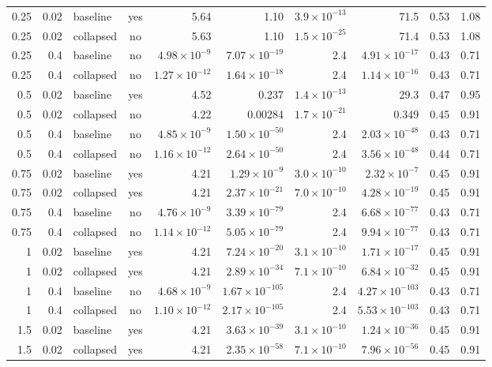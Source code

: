 \documentclass[11pt,letterpaper,fleqn]{article}
\begin{document}
\begin{table}[p]
\begin{adjustbox}{max width=\textwidth}
\begin{tabular}{@{}rrlcrrrrrr@{}}
0.25 & 0.02 & baseline & yes & 5.64 & 1.10 & $3.9\times10^{-13}$ & 71.5 & 0.53 & 1.08\\
0.25 & 0.02 & collapsed & no & 5.63 & 1.10 & $1.5\times10^{-25}$ & 71.4 & 0.53 & 1.08\\
0.25 & 0.4 & baseline & no & $4.98\times10^{-9}$ & $7.07\times10^{-19}$ & 2.4 & $4.91\times10^{-17}$ & 0.43 & 0.71\\
0.25 & 0.4 & collapsed & no & $1.27\times10^{-12}$ & $1.64\times10^{-18}$ & 2.4 & $1.14\times10^{-16}$ & 0.43 & 0.71\\
0.5 & 0.02 & baseline & yes & 4.52 & 0.237 & $1.4\times10^{-13}$ & 29.3 & 0.47 & 0.95\\
0.5 & 0.02 & collapsed & no & 4.22 & 0.00284 & $1.7\times10^{-21}$ & 0.349 & 0.45 & 0.91\\
0.5 & 0.4 & baseline & no & $4.85\times10^{-9}$ & $1.50\times10^{-50}$ & 2.4 & $2.03\times10^{-48}$ & 0.43 & 0.71\\
0.5 & 0.4 & collapsed & no & $1.16\times10^{-12}$ & $2.64\times10^{-50}$ & 2.4 & $3.56\times10^{-48}$ & 0.44 & 0.71\\
0.75 & 0.02 & baseline & yes & 4.21 & $1.29\times10^{-9}$ & $3.0\times10^{-10}$ & $2.32\times10^{-7}$ & 0.45 & 0.91\\
0.75 & 0.02 & collapsed & yes & 4.21 & $2.37\times10^{-21}$ & $7.0\times10^{-10}$ & $4.28\times10^{-19}$ & 0.45 & 0.91\\
0.75 & 0.4 & baseline & no & $4.76\times10^{-9}$ & $3.39\times10^{-79}$ & 2.4 & $6.68\times10^{-77}$ & 0.43 & 0.71\\
0.75 & 0.4 & collapsed & no & $1.14\times10^{-12}$ & $5.05\times10^{-79}$ & 2.4 & $9.94\times10^{-77}$ & 0.43 & 0.71\\
1 & 0.02 & baseline & yes & 4.21 & $7.24\times10^{-20}$ & $3.1\times10^{-10}$ & $1.71\times10^{-17}$ & 0.45 & 0.91\\
1 & 0.02 & collapsed & yes & 4.21 & $2.89\times10^{-34}$ & $7.1\times10^{-10}$ & $6.84\times10^{-32}$ & 0.45 & 0.91\\
1 & 0.4 & baseline & no & $4.68\times10^{-9}$ & $1.67\times10^{-105}$ & 2.4 & $4.27\times10^{-103}$ & 0.43 & 0.71\\
1 & 0.4 & collapsed & no & $1.10\times10^{-12}$ & $2.17\times10^{-105}$ & 2.4 & $5.53\times10^{-103}$ & 0.43 & 0.71\\
1.5 & 0.02 & baseline & yes & 4.21 & $3.63\times10^{-39}$ & $3.1\times10^{-10}$ & $1.24\times10^{-36}$ & 0.45 & 0.91\\
1.5 & 0.02 & collapsed & yes & 4.21 & $2.35\times10^{-58}$ & $7.1\times10^{-10}$ & $7.96\times10^{-56}$ & 0.45 & 0.91\\

\end{tabular}
\end{adjustbox}
\end{table}
\end{document}
